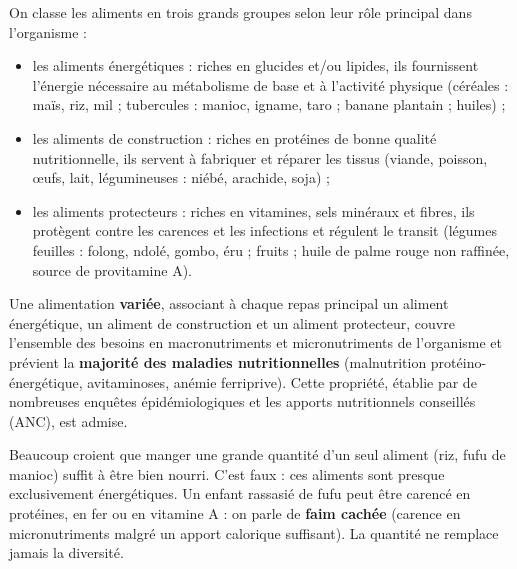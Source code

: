 \documentclass[11pt]{article}
\newcommand{\cle}[1]{{\popxbold\color{popdark}#1}}
\begin{document}
\begin{definition}
On classe les aliments en trois grands groupes selon leur rôle principal dans l'organisme :
\begin{itemize}
\item les \cle{aliments énergétiques} : riches en glucides et/ou lipides, ils fournissent l'énergie nécessaire au métabolisme de base et à l'activité physique (céréales : maïs, riz, mil ; tubercules : manioc, igname, taro ; banane plantain ; huiles) ;
\item les \cle{aliments de construction} : riches en protéines de bonne qualité nutritionnelle, ils servent à fabriquer et réparer les tissus (viande, poisson, œufs, lait, légumineuses : niébé, arachide, soja) ;
\item les \cle{aliments protecteurs} : riches en vitamines, sels minéraux et fibres, ils protègent contre les carences et les infections et régulent le transit (légumes feuilles : folong, ndolé, gombo, éru ; fruits ; huile de palme rouge non raffinée, source de provitamine A).
\end{itemize}
\end{definition}

\begin{propriete}
Une alimentation \textbf{variée}, associant à chaque repas principal un aliment énergétique, un aliment de construction et un aliment protecteur, couvre l'ensemble des besoins en macronutriments et micronutriments de l'organisme et prévient la \textbf{majorité des maladies nutritionnelles} (malnutrition protéino-énergétique, avitaminoses, anémie ferriprive). Cette propriété, établie par de nombreuses enquêtes épidémiologiques et les apports nutritionnels conseillés (ANC), est admise.
\end{propriete}

\begin{attention}[Erreur fréquente : « bien manger » = « manger beaucoup »]
Beaucoup croient que manger une grande quantité d'un seul aliment (riz, fufu de manioc) suffit à être bien nourri. C'est faux : ces aliments sont presque exclusivement énergétiques. Un enfant rassasié de fufu peut être carencé en protéines, en fer ou en vitamine A : on parle de \textbf{faim cachée} (carence en micronutriments malgré un apport calorique suffisant). La quantité ne remplace jamais la diversité.
\end{attention}
\end{document}
